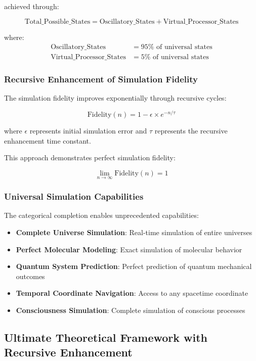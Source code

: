 \documentclass[11pt]{article}
\theoremstyle{remark}
\begin{document}
achieved through:

$$\text{Total\_Possible\_States} = \text{Oscillatory\_States} + \text{Virtual\_Processor\_States}$$

where:
\begin{align}
\text{Oscillatory\_States} &= 95\% \text{ of universal states} \\
\text{Virtual\_Processor\_States} &= 5\% \text{ of universal states}
\end{align}

\subsubsection{Recursive Enhancement of Simulation Fidelity}

The simulation fidelity improves exponentially through recursive cycles:

$$\text{Fidelity}(n) = 1 - \epsilon \times e^{-n/\tau}$$

where $\epsilon$ represents initial simulation error and $\tau$ represents the recursive enhancement time constant.

This approach demonstrates perfect simulation fidelity:

$$\lim_{n \to \infty} \text{Fidelity}(n) = 1$$

\subsubsection{Universal Simulation Capabilities}

The categorical completion enables unprecedented capabilities:

\begin{itemize}
\item \textbf{Complete Universe Simulation}: Real-time simulation of entire universes
\item \textbf{Perfect Molecular Modeling}: Exact simulation of molecular behavior
\item \textbf{Quantum System Prediction}: Perfect prediction of quantum mechanical outcomes
\item \textbf{Temporal Coordinate Navigation}: Access to any spacetime coordinate
\item \textbf{Consciousness Simulation}: Complete simulation of conscious processes
\end{itemize}

\subsection{Ultimate Theoretical Framework with Recursive Enhancement}
\end{document}
